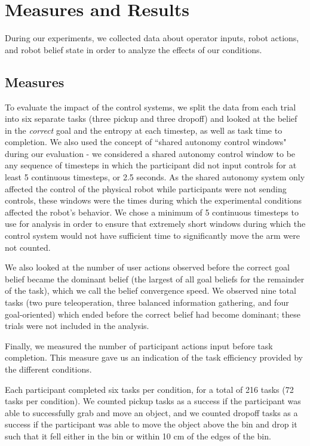 \documentclass[conference]{IEEEtran}
\begin{document}
\section{Measures and Results}

During our experiments, we collected data about operator inputs, robot actions, and robot belief state in order to analyze the effects of our conditions.

\subsection{Measures}

To evaluate the impact of the control systems, we split the data from each trial into six separate tasks (three pickup and three dropoff) and looked at the belief in the \textit{correct} goal and the entropy at each timestep, as well as task time to completion. We also used the concept of ``shared autonomy control windows" during our evaluation - we considered a shared autonomy control window to be any sequence of timesteps in which the participant did not input controls for at least 5 continuous timesteps, or 2.5 seconds. As the shared autonomy system only affected the control of the physical robot while participants were not sending controls, these windows were the times during which the experimental conditions affected the robot's behavior. We chose a minimum of 5 continuous timesteps to use for analysis in order to ensure that extremely short windows during which the control system would not have sufficient time to significantly move the arm were not counted.

We also looked at the number of user actions observed before the correct goal belief became the dominant belief (the largest of all goal beliefs for the remainder of the task), which we call the belief convergence speed. We observed nine total tasks (two pure teleoperation, three balanced information gathering, and four goal-oriented) which ended before the correct belief had become dominant; these trials were not included in the analysis.

Finally, we measured the number of participant actions input before task completion. This measure gave us an indication of the task efficiency provided by the different conditions.

Each participant completed six tasks per condition, for a total of 216 tasks (72 tasks per condition). We counted pickup tasks as a success if the participant was able to successfully grab and move an object, and we counted dropoff tasks as a success if the participant was able to move the object above the bin and drop it such that it fell either in the bin or within 10 cm of the edges of the bin.
\end{document}
